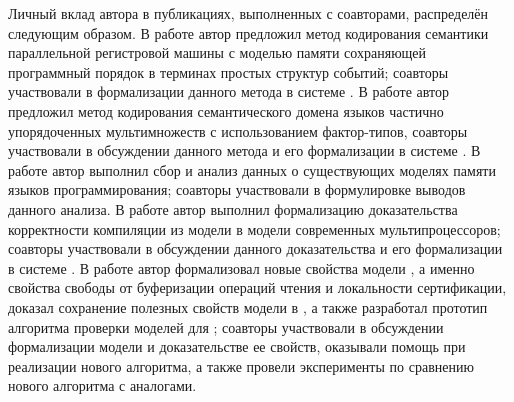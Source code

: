 
Личный вклад автора в публикациях, выполненных с соавторами, распределён следующим образом.
В работе \cite{Gladstein-al:ISPRAS21} автор предложил
метод кодирования семантики параллельной регистровой машины с
моделью памяти сохраняющей программный порядок в терминах простых структур событий;
соавторы участвовали в формализации данного метода в системе \coq.
В работе \cite{Moiseenko-al:STJITMO22} автор предложил
метод кодирования семантического домена языков частично упорядоченных мультимножеств
с использованием фактор-типов, 
соавторы участвовали в обсуждении данного метода и его формализации в системе \coq.
В работе \cite{Moiseenko-al:PCS21} автор выполнил сбор и анализ данных
о существующих моделях памяти языков программирования;
соавторы участвовали в формулировке выводов данного анализа.
В работе \cite{Moiseenko-al:ECOOP20} автор выполнил
формализацию доказательства корректности компиляции из
модели \Wkm в модели современных мультипроцессоров;
соавторы участвовали в обсуждении данного доказательства
и его формализации в системе \coq.
В работе \cite{Moiseenko-al:OOPSLA22} автор
формализовал новые свойства модели \WkmS,
а именно свойства свободы от буферизации операций чтения и локальности сертификации,
доказал сохранение полезных свойств модели \Wkm в \WkmS,
а также разработал прототип алгоритма проверки моделей для \WkmS;
соавторы участвовали в обсуждении формализации модели \WkmS
и доказательстве ее свойств,
оказывали помощь при реализации нового алгоритма,
а также провели эксперименты по сравнению нового алгоритма с аналогами.
